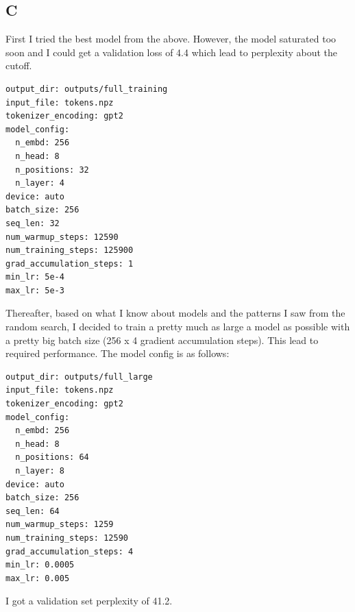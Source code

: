 \documentclass{article}
\begin{document}
\subsection*{C}
First I tried the best model from the above. However, the model saturated too soon and I could get a validation loss of 4.4 which lead to perplexity about the cutoff.
\begin{verbatim}
output_dir: outputs/full_training 
input_file: tokens.npz
tokenizer_encoding: gpt2         
model_config:
  n_embd: 256                   
  n_head: 8                    
  n_positions: 32             
  n_layer: 4                      
device: auto                 
batch_size: 256             
seq_len: 32                
num_warmup_steps: 12590   
num_training_steps: 125900
grad_accumulation_steps: 1
min_lr: 5e-4             
max_lr: 5e-3            
\end{verbatim}
Thereafter, based on what I know about models and the patterns I saw from the random search, I decided to train a pretty much as large a model as possible with a pretty big batch size (256 x 4 gradient accumulation steps). This lead to required performance. The model config is as follows:
\begin{verbatim}
output_dir: outputs/full_large
input_file: tokens.npz
tokenizer_encoding: gpt2
model_config:
  n_embd: 256
  n_head: 8
  n_positions: 64
  n_layer: 8
device: auto
batch_size: 256
seq_len: 64
num_warmup_steps: 1259
num_training_steps: 12590
grad_accumulation_steps: 4
min_lr: 0.0005
max_lr: 0.005
\end{verbatim}
I got a validation set perplexity of 41.2.
\end{document}

